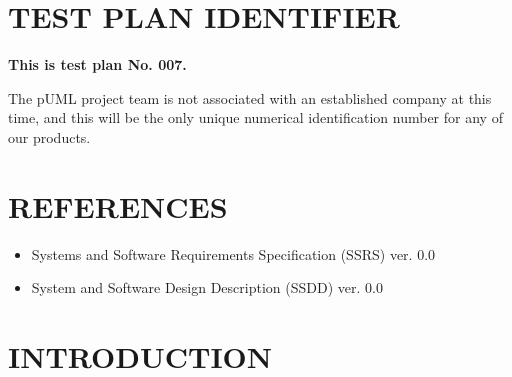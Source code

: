 \documentclass[twoside,letterpaper]{article}
\begin{document}
\setcounter{page}{1}\pagestyle{Convertiv}

\clearpage

\section[IDENTIFIER]{\bfseries TEST PLAN IDENTIFIER}

\bfseries This is test plan No. 007.  

\bigskip

The pUML project team is not associated with an established company at this time, and this will be the only unique numerical identification number for any of our products.

\section[REFERENCES]{\bfseries REFERENCES}

\begin{itemize}
\item   Systems and Software Requirements Specification (SSRS) ver. 0.0
\item   System and Software Design Description (SSDD) ver. 0.0
\end{itemize}

\section[INTRODUCTION]{\bfseries INTRODUCTION}

\end{document}
